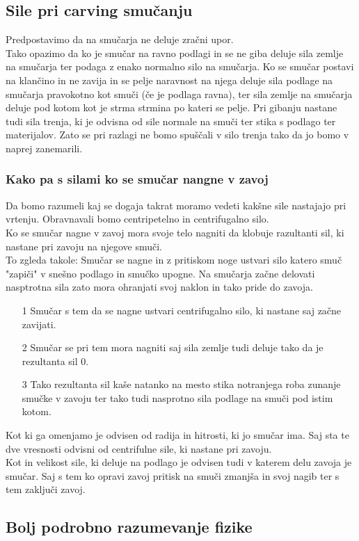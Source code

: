 \documentclass{article}
\begin{document}
\subsection*{Sile pri carving smučanju}
Predpostavimo da na smučarja ne deluje zračni upor. \\ \newline
Tako opazimo da ko je smučar na ravno podlagi in se ne giba deluje sila zemlje na smučarja ter podaga z enako normalno silo na smučarja. 
Ko se smučar postavi na klančino in ne zavija in se pelje naravnost na njega deluje sila podlage na smučarja pravokotno kot smuči (če je podlaga ravna),
ter sila zemlje na smučarja deluje pod kotom kot je strma strmina po kateri se pelje. Pri gibanju nastane tudi sila trenja, ki je odvisna od 
sile normale na smuči ter stika s podlago ter materijalov. Zato se pri razlagi ne bomo spuščali v silo trenja tako da jo bomo v naprej zanemarili.

\subsubsection*{Kako pa s silami ko se smučar nangne v zavoj}
Da bomo razumeli kaj se dogaja takrat moramo vedeti kakšne sile nastajajo pri vrtenju. Obravnavali bomo centripetelno in centrifugalno silo. \\ \newline
Ko se smučar nagne v zavoj mora svoje telo nagniti da klobuje razultanti sil, ki nastane pri zavoju na njegove smuči. \\ \newline
To zgleda takole: \newline
Smučar se nagne in z pritiskom noge ustvari silo katero smuč "zapiči" v snešno podlago in smučko upogne. Na smučarja začne delovati nasptrotna sila zato mora ohranjati svoj naklon in tako pride do zavoja.
\begin{itemize}
    \item[1] Smučar s tem da se nagne ustvari centrifugalno silo, ki nastane saj začne zavijati.
    \item[2] Smučar se pri tem mora nagniti saj sila zemlje tudi deluje tako da je rezultanta sil 0. 
    \item[3] Tako rezultanta sil kaše natanko na mesto stika notranjega roba zunanje smučke v zavoju ter tako tudi nasprotno sila podlage na smuči pod istim kotom.
\end{itemize} 
Kot ki ga omenjamo je odvisen od radija in hitrosti, ki jo smučar ima. Saj sta te dve vresnosti odvisni od centrifulne sile, ki nastane pri zavoju. \\ \newline
Kot in velikost sile, ki deluje na podlago je odvisen tudi v katerem delu zavoja je smučar. Saj s tem ko opravi zavoj pritisk na smuči zmanjša in svoj nagib ter s tem zaključi zavoj.

\subsection{Bolj podrobno razumevanje fizike}
\end{document}

